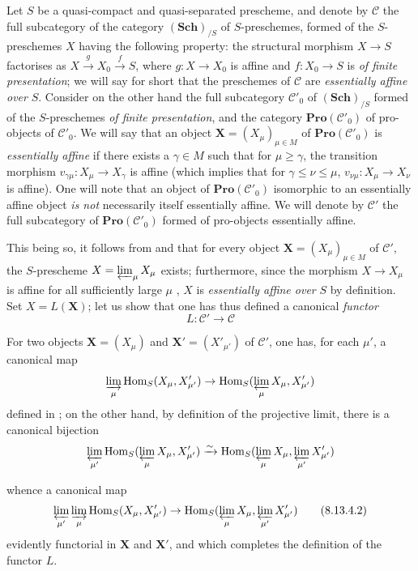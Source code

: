 \begin{env}[8.13.4]
\label{IV.8.13.4}
Let $S$ be a quasi-compact and quasi-separated prescheme, and denote by $\mathcal{C}$ the full subcategory of the category $(\mathbf{Sch})_{/S}$ of $S$-preschemes, formed of the $S$-preschemes $X$ having the following property: the structural morphism $X\to S$ factorises as $X\xrightarrow{g}X_0\xrightarrow{f}S$, where $g:X\to X_0$ is affine and $f:X_0\to S$ is \emph{of finite presentation}; we will say for short that the preschemes of $\mathcal{C}$ are \emph{essentially affine over} $S$.
Consider on the other hand the full subcategory $\mathcal{C}'_0$ of $(\mathbf{Sch})_{/S}$ formed of the $S$-preschemes \emph{of finite presentation}, and the category $\mathbf{Pro}(\mathcal{C}'_0)$ of pro-objects of $\mathcal{C}'_0$.
We will say that an object $\mathbf{X}=(X_\mu)_{\mu\in M}$ of $\mathbf{Pro}(\mathcal{C}'_0)$ is \emph{essentially affine} if there exists a $\gamma\in M$ such that for $\mu\geqslant\gamma$, the transition morphism $v_{\gamma\mu}:X_\mu\to X_\gamma$ is affine (which implies that for $\gamma\leqslant\nu\leqslant\mu$, $v_{\nu\mu}:X_\mu\to X_\nu$ is affine).
One will note that an object of $\mathbf{Pro}(\mathcal{C}'_0)$ isomorphic to an essentially affine object \emph{is not} necessarily itself essentially affine.
We will denote by $\mathcal{C}'$ the full subcategory of $\mathbf{Pro}(\mathcal{C}'_0)$ formed of pro-objects essentially affine.

This being so, it follows from  and  that for every object $\mathbf{X}=(X_\mu)_{\mu\in M}$ of $\mathcal{C}'$, the $S$-prescheme $X=\varprojlim_\mu X_\mu$ exists; furthermore, since the morphism $X\to X_\mu$ is affine for all sufficiently large $\mu$ , $X$ is \emph{essentially affine over} $S$ by definition.
Set $X=L(\mathbf{X})$; let us show that one has thus defined a canonical \emph{functor}
\begin{equation}
\label{IV.8.13.4.1}
L:\mathcal{C}'\to\mathcal{C} \tag{8.13.4.1}
\end{equation}

For two objects $\mathbf{X}=(X_\mu)$ and $\mathbf{X}'=(X'_{\mu'})$ of $\mathcal{C}'$, one has, for each $\mu'$, a canonical map
\[
\varinjlim_\mu\operatorname{Hom}_S(X_\mu,X'_{\mu'})\to\operatorname{Hom}_S(\varprojlim_\mu X_\mu,X'_{\mu'})
\]
defined in ; on the other hand, by definition of the projective limit, there is a canonical bijection
\[
\varprojlim_{\mu'}\operatorname{Hom}_S(\varprojlim_\mu X_\mu,X'_{\mu'})\xrightarrow{\sim}\operatorname{Hom}_S(\varprojlim_\mu X_\mu,\varprojlim_{\mu'}X'_{\mu'})
\]

whence a canonical map
\begin{equation}
\label{IV.8.13.4.2}
\varprojlim_{\mu'}\varinjlim_\mu\operatorname{Hom}_S(X_\mu,X'_{\mu'})\to\operatorname{Hom}_S(\varprojlim_\mu X_\mu,\varprojlim_{\mu'}X'_{\mu'}) \tag{8.13.4.2}
\end{equation}
evidently functorial in $\mathbf{X}$ and $\mathbf{X}'$, and which completes the definition of the functor $L$.
\end{env}

